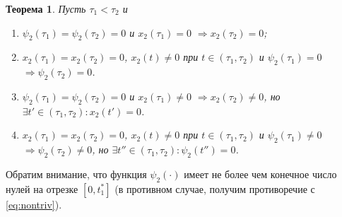 \documentclass[11pt, oneside, final]{article}
\theoremstyle{break}
\numberwithin{equation}{section}
\theoremstyle{plain}
\newtheorem{theorem}{Теорема}[section]
\theoremstyle{definition}
\begin{document}
\begin{theorem} \label{thm:zeros}
	Пусть \( \tau_1<\tau_2 \) и
	\begin{enumerate}
		\item \( \psi_2(\tau_1)=\psi_2(\tau_2)=0 \) и \( x_2(\tau_1)=0 \) \( \Rightarrow x_2(\tau_2)=0 \);
		
		\item \( x_2(\tau_1)=x_2(\tau_2)=0 \), \( x_2(t)\ne0 \) при \( t\in(\tau_1,\tau_2) \) и \( \psi_2(\tau_1)=0 \) \( \Rightarrow\psi_2(\tau_2)=0 \).
		
		\item \( \psi_2(\tau_1)=\psi_2(\tau_2)=0 \) и \( x_2(\tau_1)\ne0 \) \( \Rightarrow x_2(\tau_2)\ne0 \), но \( \exists t'\in(\tau_1,\tau_2):x_2(t')=0 \).
		
		\item \( x_2(\tau_1)=x_2(\tau_2)=0 \), \( x_2(t)\ne0 \) при \( t\in(\tau_1,\tau_2) \) и \( \psi_2(\tau_1)\ne0 \) \( \Rightarrow\psi_2(\tau_2)\ne0 \), но \( \exists t''\in(\tau_1,\tau_2):\psi_2(t'')=0 \).
	\end{enumerate}
\end{theorem}
Обратим внимание, что функция \( \psi_2(\cdot) \) имеет не более чем конечное число нулей на отрезке \( [0,t_1^*] \) (в противном случае, получим противоречие с \eqref{eq:nontriv}).
\end{document}
